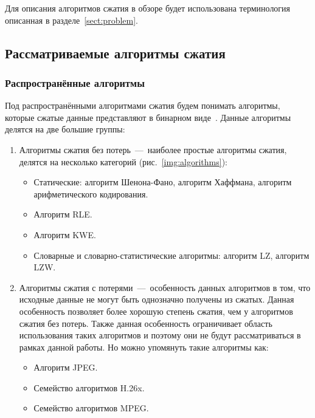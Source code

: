 \documentclass[oneside,final,12pt]{extarticle}
\begin{document}
        Для описания алгоритмов сжатия в обзоре будет использована терминология описанная в разделе~\ref{sect:problem}. 

    \subsection{Рассматриваемые алгоритмы сжатия}
        \subsubsection{Распространённые алгоритмы}
            Под распространёнными алгоритмами сжатия будем понимать алгоритмы, 
            которые сжатые данные представляют в бинарном виде~\cite{kodituwakku2010comparison}. 
            Данные алгоритмы делятся на две большие группы:
            \begin{enumerate}
                \item Алгоритмы сжатия без потерь~---~наиболее простые алгоритмы сжатия, делятся на несколько категорий (рис.~\ref{img:algorithms}):
                    \begin{itemize}
                    \item Статические: алгоритм Шенона-Фано, алгоритм Хаффмана, алгоритм арифметического кодирования.
                    \item Алгоритм RLE.
                    \item Алгоритм KWE.
                    \item Словарные и словарно-статистические алгоритмы: алгоритм LZ, алгоритм LZW.
                    \end{itemize}
                \item Алгоритмы сжатия с потерями~---~особенность данных алгоритмов в том, что исходные данные не могут быть однозначно
                    получены из сжатых. Данная особенность позволяет более хорошую степень сжатия, чем у алгоритмов сжатия без потерь.
                    Также данная особенность ограничивает область использования таких алгоритмов и поэтому они не будут рассматриваться в рамках данной работы. 
                    Но можно упомянуть такие алгоритмы как:
                    \begin{itemize}
                    \item Алгоритм JPEG.
                    \item Семейство алгоритмов H.26x.
                    \item Семейство алгоритмов MPEG.
                    \end{itemize}
            \end{enumerate}
            
\end{document}
